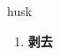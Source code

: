 
\begin{frame}
{\huge husk}
\begin{center}
\begin{enumerate}\Large
  \item \textbf{剥去}
\end{enumerate}
\end{center}
\end{frame}
